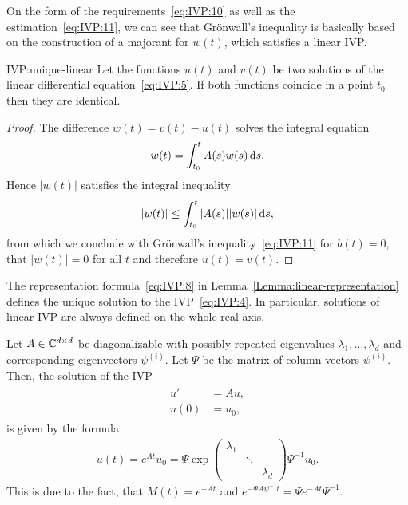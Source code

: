 
\begin{remark}
	On the form of the requirements~\eqref{eq:IVP:10} as well as the
  estimation~\eqref{eq:IVP:11}, we can see that Grönwall's
  inequality is basically based on the construction of a majorant for 
	$w(t)$, which satisfies a linear IVP.
\end{remark}

\begin{Corollary}{IVP:unique-linear}
  Let the functions $u(t)$ and $v(t)$ be two solutions of the linear
  differential equation~\eqref{eq:IVP:5}. If both functions
  coincide in a point $t_0$ then they are identical.
\end{Corollary}

\begin{proof}
	The difference $w(t) = v(t) - u(t)$ solves the integral equation
  \begin{gather*}
    w(t) = \int_{t_0}^t A(s) w(s) \,\mathrm{d} s.
  \end{gather*}
  Hence $|w(t)|$ satisfies the integral inequality
  \begin{gather*}
    |w(t)| \le \int_{t_0}^t |A(s)| |w(s)| \,\mathrm{d} s,
  \end{gather*}
	from which we conclude with Grönwall's inequality~\eqref{eq:IVP:11} 
	for $b(t) = 0$, that $|w(t)|=0$ for all $t$ and therefore
  $u(t) = v(t)$.
\end{proof}

\begin{corollary}
  The representation formula~\eqref{eq:IVP:8} in
  Lemma~\ref{Lemma:linear-representation} defines the unique solution to the
  IVP~\eqref{eq:IVP:4}. In particular, solutions of linear IVP are
  always defined on the whole real axis.
\end{corollary}

\begin{example}
  Let $A \in \mathbb C^{d\times d}$ be diagonalizable with possibly repeated
  eigenvalues $\lambda_1,\dots,\lambda_d$ and corresponding
  eigenvectors $\psi^{(i)}$. Let $\Psi$ be the matrix of column
  vectors $\psi^{(i)}$. Then, the solution of the IVP
  \begin{gather*}
    \begin{split}
      u' &= A u,\\
      u(0) &= u_0,
    \end{split}
  \end{gather*}
  is given by the formula
  \begin{gather*}
    u(t) = e^{At} u_0 = \Psi \exp
    \begin{pmatrix}
      \lambda_1\\&\ddots\\&&\lambda_d
    \end{pmatrix}
    \Psi^{-1} u_0.
  \end{gather*}
  This is due to the fact, that $M(t) = e^{-At}$ and $e^{-\Psi A
    \psi^{-1}t} = \Psi e^{-At} \Psi^{-1}$.
\end{example}

